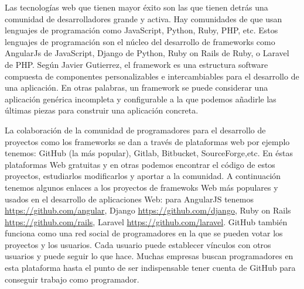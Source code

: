 \documentclass[twocolumns,a4paper]{IEEEtran}
\begin{document}
Las tecnologías web que tienen mayor éxito son las que tienen detrás una
comunidad de desarrolladores grande y activa. Hay comunidades de que usan
lenguajes de programación como JavaScript, Python, Ruby, PHP, etc. Estos
lenguajes de programación son el núcleo del desarrollo de frameworks como
AngularJs de JavaScript, Django de Python, Ruby on Rails de Ruby, o Laravel de
PHP. Según Javier Gutierrez, el framework es una estructura software compuesta
de componentes personalizables e intercambiables para el desarrollo de una
aplicación. En otras palabras, un framework se puede considerar una aplicación
genérica incompleta y configurable a la que podemos añadirle las últimas piezas
para construir una aplicación concreta.\cite{GutierrezFramework}
\newline

La colaboración de la comunidad de programadores para el desarrollo de
proyectos como los frameworks se dan a través de plataformas web por ejemplo
tenemos: GitHub (la más popular), Gitlab, Bitbucket, SourceForge,etc. En éstas
plataformas Web gratuitas y en otras podemos encontrar el código de estos
proyectos, estudiarlos modificarlos y aportar a la comunidad. A continuación
tenemos algunos enlaces a los proyectos de framewoks Web más populares y usados
en el desarrollo de aplicaciones Web: para AngularJS tenemos
\url{https://github.com/angular}, Django \url{https://github.com/django}, Ruby
on Rails \url{https://github.com/rails}, Laravel
\url{https://github.com/laravel}. GitHub también funciona como una red social
de programadores en la que se pueden votar los proyectos y los usuarios. Cada
usuario puede establecer vínculos con otros usuarios y puede seguir lo que
hace. Muchas empresas buscan programadores en esta plataforma hasta el punto de
ser indispensable tener cuenta de GitHub para conseguir trabajo como
programador\cite{LuisGitHub2016}.
\newline
\end{document}
